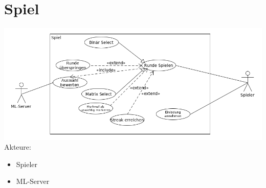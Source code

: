 \documentclass[a4paper]{scrreprt}
\begin{document}
    \section{Spiel}
    \includegraphics[width=\textwidth]{uml/export/Spiel.png}
    Akteure: 
    \begin{itemize}
    \item \Gls{Spieler}
    \item \Gls{ML-Server}
    \end{itemize}
\end{document}
